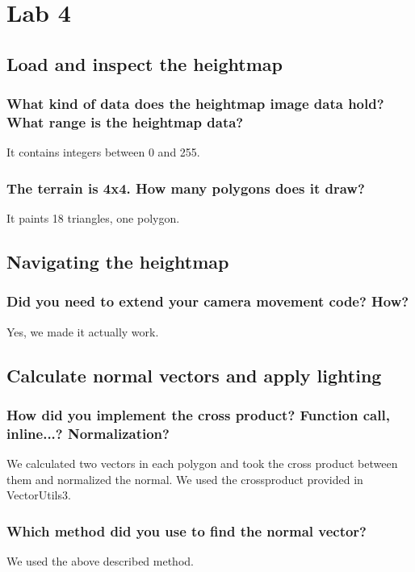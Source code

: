 \documentclass[a4paper,12pt]{article}
\begin{document}
\section{Lab 4}
\subsection{Load and inspect the heightmap}
\subsubsection{What kind of data does the heightmap image data hold? What range is the heightmap data?}
It contains integers between 0 and 255.

\subsubsection{The terrain is 4x4. How many polygons does it draw?}
It paints 18 triangles, one polygon.


\subsection{Navigating the heightmap}
\subsubsection{Did you need to extend your camera movement code? How?}
Yes, we made it actually work.

\subsection{Calculate normal vectors and apply lighting}
\subsubsection{How did you implement the cross product? Function call, inline...? Normalization? }
We calculated two vectors in each polygon and took the cross product between them and normalized the normal. We used the crossproduct provided in VectorUtils3.

\subsubsection{Which method did you use to find the normal vector?}
We used the above described method.
\end{document}
